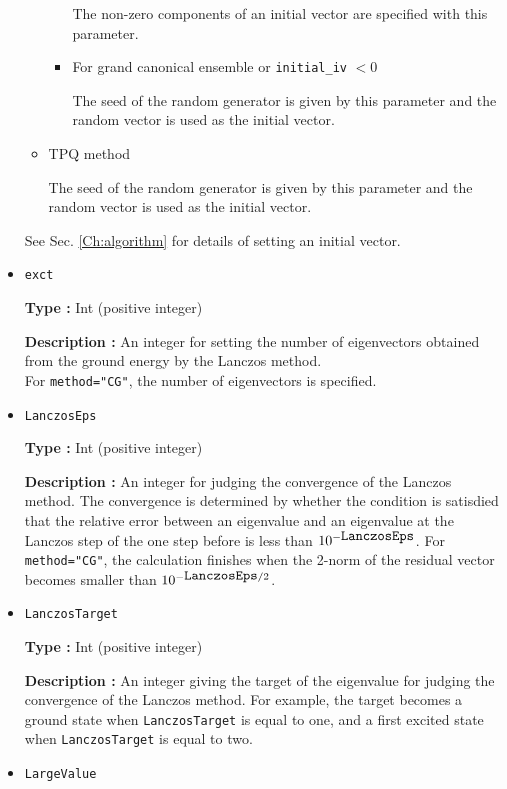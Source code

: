 \begin{itemize}
\begin{itemize}
\begin{itemize}
The non-zero components of an initial vector are specified with this parameter. 

\item{For grand canonical ensemble or \verb|initial_iv| $< 0$}

The seed of the random generator is given by this parameter and the random vector is used as the initial vector.
\end{itemize}

\item{TPQ method}

The seed of the random generator is given by this parameter and the random vector is used as the initial vector.
\end{itemize}
See Sec. \ref{Ch:algorithm} for details of setting an initial vector.

 \item  \verb|exct|

{\bf Type :} Int (positive integer)

{\bf Description :} 
 An integer for setting the number of eigenvectors obtained from the ground energy by the Lanczos method.\\
For \verb|method="CG"|, the number of eigenvectors is specified.

\item   \verb|LanczosEps|
   
{\bf Type :} Int (positive integer)

{\bf Description :} An integer for judging the convergence of the Lanczos method. The convergence is determined by whether the condition is satisdied that the relative error between an eigenvalue and an eigenvalue at the Lanczos step of the one step before is less than $10^{- \verb|LanczosEps|}$.
For \verb|method="CG"|, the calculation finishes when the 2-norm of the residual vector
becomes smaller than $10^{- \verb|LanczosEps|/2}$.

 \item  \verb|LanczosTarget| 
   
 {\bf Type :} Int (positive integer)

  {\bf Description :} An integer giving the target of the eigenvalue for judging the convergence of the Lanczos method. For example, the target becomes a ground state when \verb|LanczosTarget|  is equal to one, and a first excited state when  \verb|LanczosTarget|  is equal to two.
     
\item \verb|LargeValue|


\end{itemize}
